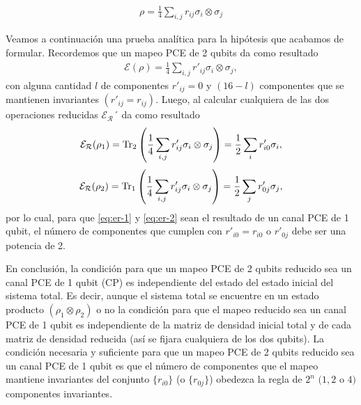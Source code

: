 \documentclass[11pt,dvipsnames]{article} %
\newcommand{\E}{\mathcal{E}}
\newcommand{\1}{\mathds{1}}
\newcommand{\Er}{\E_{\mathcal{R}}}
\begin{document}
\begin{align}
\rho=\frac{1}{4}\sum _{i,j}r_{ij}\sigma_i\otimes\sigma_j
\label{eq:dm-2q}
\end{align}

Veamos a continuación una prueba analítica para la hipótesis que acabamos
de formular. Recordemos que un mapeo PCE de 2 qubits da como resultado
\begin{align}
\E (\rho)=\frac{1}{4}\sum _{i,j}r'_{ij}\sigma_i\otimes\sigma_j,
\label{eq:dm-2q}
\end{align}
con alguna cantidad $l$ de componentes $r'_{ij}=0$ y $(16-l)$
componentes que se mantienen invariantes $(r'_{ij}=r_{ij})$.
Luego, al calcular cualquiera de las dos operaciones reducidas
$\Er´$ da como resultado
\begin{align}
\Er (\rho_1)= \Tr_2\qty(\frac{1}{4}\sum _{i,j}r'_{ij}\sigma_i\otimes\sigma_j)
=
\frac{1}{2}\sum_ir'_{i0}\sigma_i,
\label{eq:er-1}
\end{align}
\begin{align}
\Er (\rho_2) = \Tr_1\qty(\frac{1}{4}\sum _{i,j}r'_{ij}\sigma_i\otimes\sigma_j)
=
\frac{1}{2}\sum_j r'_{0j}\sigma_j,
\label{eq:er-2}
\end{align}
por lo cual, para que \eqref{eq:er-1} y \eqref{eq:er-2} sean 
el resultado de un canal PCE de 1 qubit, el número de componentes 
que cumplen con $r'_{i0}=r_{i0}$ o $r'_{0j}$ debe ser una potencia 
de 2.

En conclusión, la condición para que un mapeo PCE de 2 qubits 
reducido sea un canal PCE de 1 qubit (CP) es independiente del estado del 
estado inicial del sistema total. Es decir, aunque el sistema total se encuentre
en un estado producto $(\rho_1\otimes\rho_2)$ o no la condición 
para que el mapeo reducido sea un canal PCE de 1 qubit es independiente
de la matriz de densidad inicial total y de cada matriz 
de densidad reducida (así se fijara cualquiera de los dos qubits).
La condición necesaria y suficiente para que un mapeo PCE 
de 2 qubits reducido sea un canal PCE de 1 qubit es que el número 
de componentes que el mapeo mantiene invariantes del conjunto 
$\{r_{i0}\}$ (o $\{r_{0j}\}$) obedezca la regla de $2^n$ $(1, 2$ o $4)$ 
componentes invariantes.



\vfill
\end{document}
